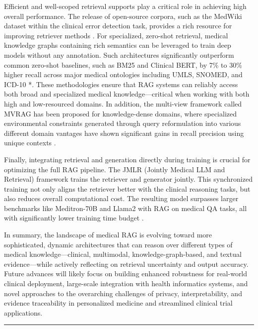 \documentclass[11pt]{article}
\begin{document}
Efficient and well-scoped retrieval supports play a critical role in achieving high overall performance. The release of open-source corpora, such as the MedWiki dataset within the clinical error detection task, provides a rich resource for improving retriever methods \cite{ref180}. For specialized, zero-shot retrieval, medical knowledge graphs containing rich semantics can be leveraged to train deep models without any annotation. Such architectures significantly outperform common zero-shot baselines, such as BM25 and Clinical BERT, by 7\% to 30\% higher recall across major medical ontologies including UMLS, SNOMED, and ICD-10 \cite{ref181} *. These methodologies ensure that RAG systems can reliably access both broad and specialized medical knowledge---critical when working with both high and low-resourced domains. In addition, the multi-view framework called MVRAG has been proposed for knowledge-dense domains, where specialized environmental constraints generated through query reformulation into various different domain vantages have shown significant gains in recall precision using unique contexts \cite{ref182}.

Finally, integrating retrieval and generation directly during training is crucial for optimizing the full RAG pipeline. The JMLR (Jointly Medical LLM and Retrieval) framework trains the retriever and generator jointly. This synchronized training not only aligns the retriever better with the clinical reasoning tasks, but also reduces overall computational cost. The resulting model surpasses larger benchmarks like Meditron-70B and Llama2 with RAG on medical QA tasks, all with significantly lower training time budget \cite{ref183}.

In summary, the landscape of medical RAG is evolving toward more sophisticated, dynamic architectures that can reason over different types of medical knowledge---clinical, multimodal, knowledge-graph-based, and textual evidence---while actively reflecting on retrieval uncertainty and output accuracy. Future advances will likely focus on building enhanced robustness for real-world clinical deployment, large-scale integration with health informatics systems, and novel approaches to the overarching challenges of privacy, interpretability, and evidence traceability in personalized medicine and streamlined clinical trial applications.

\begin{center}\rule{0.5\linewidth}{0.5pt}\end{center}
\end{document}
